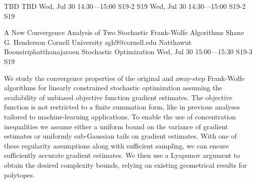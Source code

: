 \begin{talk}
  {TBD}%
  {TBD}%
  {Wed, Jul 30 14:30---15:00}%
  {S19-2}%
  {S19}%
  {}%
  {Wed, Jul 30 14:30---15:00}%
  {S19-2}%
  {S19}%
\end{talk}

\begin{talk}
  {A New Convergence Analysis of Two Stochastic Frank-Wolfe Algorithms}%
  {Shane G. Henderson}%
  {Cornell University}%
  {sgh9@cornell.edu}%
  {Natthawut Boonsiriphatthanajaroen}%
  {Stochastic Optimization}%
  {Wed, Jul 30 15:00---15:30}%
  {S19-3}%
  {S19}%
    
   
We study the convergence properties of the original and away-step
Frank-Wolfe algorithms for linearly constrained stochastic
optimization assuming the availability of unbiased objective function
gradient estimates. The objective function is not restricted to a
finite summation form, like in previous analyses tailored to
machine-learning applications. To enable the use of concentration
inequalities we assume either a uniform bound on the variance of
gradient estimates or uniformly sub-Gaussian tails on gradient
estimates. With one of these regularity assumptions along with
sufficient sampling, we can ensure sufficiently accurate gradient
estimates. We then use a Lyapunov argument to obtain the desired
complexity bounds, relying on existing geometrical results for
polytopes. 
\end{talk}

